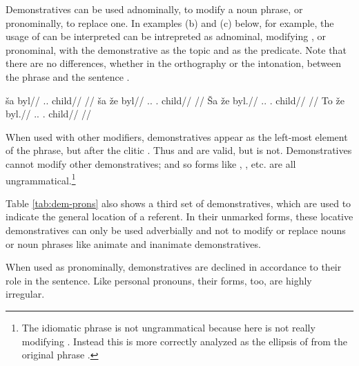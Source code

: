 Demonstratives can be used adnominally, to modify a noun phrase, or
pronominally, to replace one. In examples (b) and (c) below, for example, the
usage of  can be interpreted can be intrepreted as adnominal, modifying
, or pronominal, with the demonstrative as the topic and  as the predicate. Note that there are no differences, whether in the
orthography or the intonation, between the phrase  and the
sentence .

\pex
    \a
        \begingl
        \gla ša byl//
        \glb \Dem{}.\Prox{}.\Anim{} child//
        \glft {}//
        \endgl
    \a
        \begingl
        \gla ša že byl//
        \glb \Dem{}.\Prox{}.\Anim{} \First\Sg{}.\Gen{} child//
        \glft {}//
        \endgl
    \a
        \begingl
        \gla Ša že byl.//
        \glb \Dem{}.\Prox{}.\Anim{} \First\Sg{}.\Gen{} child//
        \glft {}//
        \endgl
    \a
        \begingl
        \gla \ljudge{*}To že byl.//
        \glb \Dem{}.\Prox{}.\Inan{} \First\Sg{}.\Gen{} child//
        \glft {}//
        \endgl
\xe

When used with other modifiers, demonstratives appear as the left-most element
of the phrase, but after the clitic . Thus  and  are valid, but
 is not. Demonstratives cannot modify other
demonstratives; and so forms like , , etc. are all
ungrammatical.\footnote{The idiomatic phrase  is
not ungrammatical because here  is not really modifying .
Instead this is more correctly analyzed as the ellipsis of  from
the original phrase .}

Table \ref{tab:dem-prons} also shows a third set of demonstratives, which are
used to indicate the general location of a referent. In their unmarked forms,
these locative demonstratives can only be used adverbially and not to modify or
replace nouns or noun phrases like animate and inanimate demonstratives.

When used as pronominally, demonstratives are declined in accordance to their role in the sentence. Like personal pronouns, their forms, too, are highly irregular.

